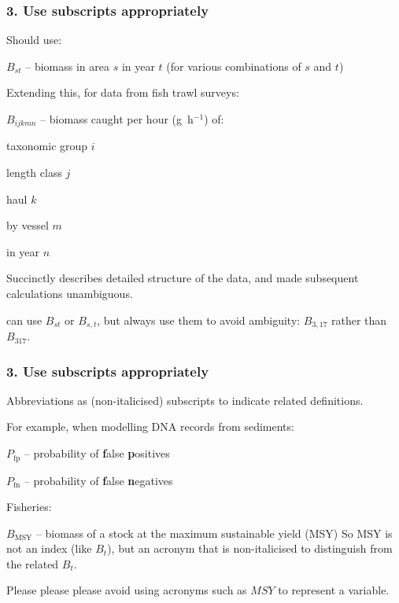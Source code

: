 
\begin{frame}
\frametitle{3. Use subscripts appropriately}

Should use:

\bi
\item $B_{st}$ -- biomass in area $s$ in year $t$ (for various combinations of $s$ and $t$)
\ei

\pause

Extending this, for data from fish trawl surveys:
\bi
  \item $B_{ijkmn}$ -- biomass caught per hour (g~h$^{-1}$) of:
  \bi
    \item taxonomic group $i$
    \item length class $j$
    \item haul $k$
    \item by vessel $m$
    \item in year $n$
  \ei
\ei

Succinctly describes detailed structure of the data, and made subsequent
calculations unambiguous.

\pause
\medskip

 can use $B_{st}$ or $B_{s,t}$, but always use them to avoid
ambiguity: $B_{3,17}$ rather than $B_{317}$.

\end{frame}


\begin{frame}
\frametitle{3. Use subscripts appropriately}

Abbreviations as (non-italicised) subscripts to indicate related
definitions.

\medskip

For example, when modelling DNA records from sediments:
\bi
  \item $P_\mathrm{fp}$ -- probability of {\bf f}alse {\bf p}ositives
  \item $P_\mathrm{fn}$ -- probability of {\bf f}alse {\bf n}egatives
\ei
\pause
\medskip

Fisheries:
\bi
  \item $B_\mathrm{MSY}$ -- biomass of a stock at the maximum sustainable yield (MSY)
\ei
So MSY is not an index (like $B_t$), but an acronym that is non-italicised to
distinguish from the related $B_t$.
\pause
\medskip

Please please please avoid using acronyms such as $MSY$ to represent a variable.

\end{frame}

